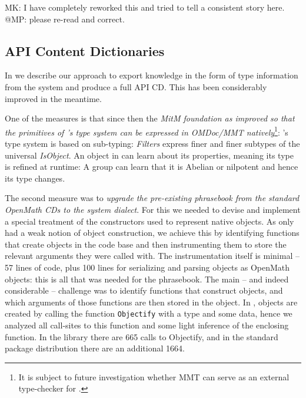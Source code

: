 \begin{newpart}{MK: I have completely reworked this and tried to tell a consistent story
    here. @MP: please re-read and correct.}
\subsection{\GAP API Content Dictionaries}

In \cite{DehKohKon:iop16} we describe our approach to export knowledge in the form of type
information from the \GAP system and produce a full \GAP API CD. This has been
considerably improved in the meantime. 

One of the measures is that since then the \emph{MitM foundation as improved so that the primitives of \GAP's type system can be
  expressed in OMDoc/MMT natively}\footnote{It is subject to future investigation whether
  MMT can serve as an external type-checker for \GAP.}: \GAP's type system is based on
sub-typing: \emph{Filters} express finer and finer subtypes of the universal
\emph{IsObject}. An object in \GAP can learn about its properties, meaning its type is
refined at runtime: A group can learn that it is Abelian or nilpotent and hence its type
changes.

The second measure was to \emph{upgrade the pre-existing \GAP phrasebook from the standard
  OpenMath CDs to the \GAP system dialect}. For this we needed to devise and implement a
special treatment of the \GAP constructors used to represent native \GAP objects. As \GAP
only had a weak notion of object construction, we achieve this by identifying functions
that create objects in the \GAP code base and then instrumenting them to store the
relevant arguments they were called with.  The instrumentation itself is minimal -- 57
lines of \GAP code, plus 100 lines for serializing and parsing \GAP objects as OpenMath
objects: this is all that was needed for the phrasebook.  The main -- and indeed
considerable -- challenge was to identify functions that construct objects, and which
arguments of those functions are then stored in the object.  In \GAP, objects are created
by calling the function \lstinline|Objectify| with a type and some data, hence we analyzed
all call-sites to this function and some light inference of the enclosing function. In the
\GAP library there are 665 calls to Objectify, and in the standard package distribution
there are an additional 1664.


\end{newpart}
